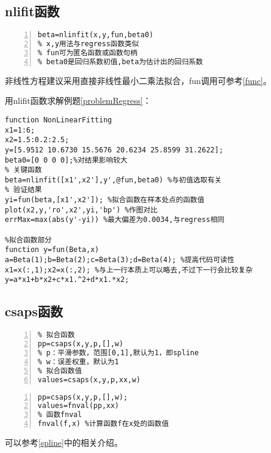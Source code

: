 \newpage

\subsection{nlifit函数}
\begin{lstlisting}[frame=single,numbers=left]
beta=nlinfit(x,y,fun,beta0)
% x,y用法与regress函数类似
% fun可为匿名函数或函数句柄
% beta0是回归系数初值,beta为估计出的回归系数
\end{lstlisting}

\begin{note}
非线性方程建议采用直接非线性最小二乘法拟合，fun调用可参考\ref{func}。
\end{note}

\begin{problem}
用nlifit函数求解例题\ref{problemRegress}：
\end{problem}

\begin{solution}
\begin{lstlisting}
function NonLinearFitting
x1=1:6;
x2=1.5:0.2:2.5;
y=[5.9512 10.6730 15.5676 20.6234 25.8599 31.2622];
beta0=[0 0 0 0];%对结果影响较大
% 关键函数
beta=nlinfit([x1',x2'],y',@fun,beta0) %与初值选取有关
% 验证结果
yi=fun(beta,[x1',x2']); %拟合函数在样本处点的函数值
plot(x2,y,'ro',x2',yi,'bp') %作图对比
errMax=max(abs(y'-yi)) %最大偏差为0.0034,与regress相同

%拟合函数部分
function y=fun(Beta,x)
a=Beta(1);b=Beta(2);c=Beta(3);d=Beta(4); %提高代码可读性
x1=x(:,1);x2=x(:,2); %与上一行本质上可以略去,不过下一行会比较复杂
y=a*x1+b*x2+c*x1.^2+d*x1.*x2;
\end{lstlisting}
\end{solution}
\newpage
\subsection{csaps函数}\label{fnval}
\begin{lstlisting}[frame=single,numbers=left]
% Cubic smoothing spline 平滑三次样条拟合函数
% 拟合函数
pp=csaps(x,y,p,[],w)
% p：平滑参数，范围[0,1],默认为1，即spline
% w：误差权重，默认为1
% 拟合函数值
values=csaps(x,y,p,xx,w)
\end{lstlisting}

\begin{lstlisting}[frame=single,numbers=left]
pp=csaps(x,y,p,[],w);
values=fnval(pp,xx) 
% 函数fnval
fnval(f,x) %计算函数f在x处的函数值
\end{lstlisting}

\begin{note}
可以参考\ref{spline}中的相关介绍。
\end{note}